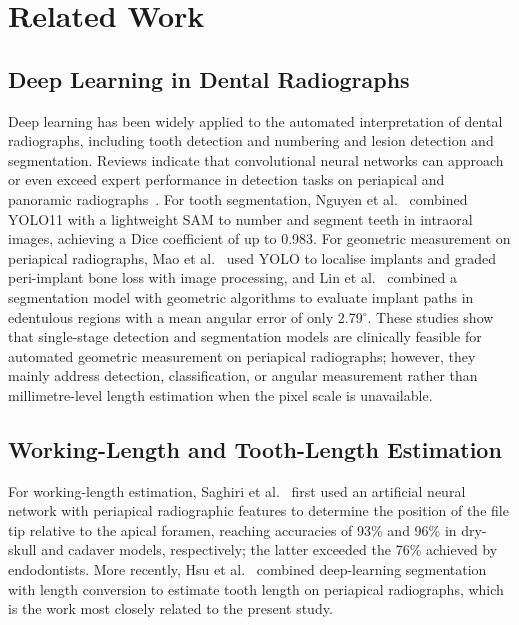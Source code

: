 \section{Related Work}

\subsection{Deep Learning in Dental Radiographs}
Deep learning has been widely applied to the automated interpretation of dental radiographs, including tooth detection and numbering and lesion detection and segmentation. Reviews indicate that convolutional neural networks can approach or even exceed expert performance in detection tasks on periapical and panoramic radiographs~\cite{Aminoshariae2021,Fontenele2025}. For tooth segmentation, Nguyen et al.~\cite{Nguyen2025} combined YOLO11 with a lightweight SAM to number and segment teeth in intraoral images, achieving a Dice coefficient of up to 0.983. For geometric measurement on periapical radiographs, Mao et al.~\cite{Mao2026} used YOLO to localise implants and graded peri-implant bone loss with image processing, and Lin et al.~\cite{Lin2026} combined a segmentation model with geometric algorithms to evaluate implant paths in edentulous regions with a mean angular error of only 2.79$^\circ$. These studies show that single-stage detection and segmentation models are clinically feasible for automated geometric measurement on periapical radiographs; however, they mainly address detection, classification, or angular measurement rather than millimetre-level length estimation when the pixel scale is unavailable.

\subsection{Working-Length and Tooth-Length Estimation}
For working-length estimation, Saghiri et al.~\cite{Saghiri2012a,Saghiri2012b} first used an artificial neural network with periapical radiographic features to determine the position of the file tip relative to the apical foramen, reaching accuracies of 93\% and 96\% in dry-skull and cadaver models, respectively; the latter exceeded the 76\% achieved by endodontists. More recently, Hsu et al.~\cite{Hsu2026} combined deep-learning segmentation with length conversion to estimate tooth length on periapical radiographs, which is the work most closely related to the present study.

